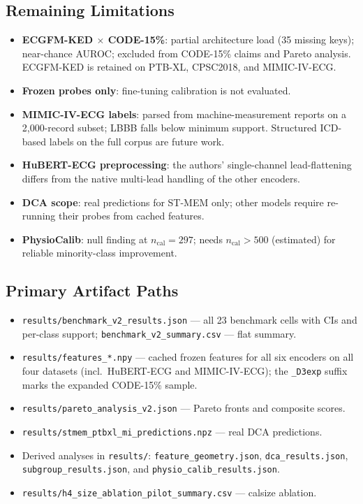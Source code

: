 \subsection{Remaining Limitations}

\begin{itemize}
  \item \textbf{ECGFM-KED $\times$ CODE-15\%}: partial architecture load (35 missing keys);
    near-chance AUROC; excluded from CODE-15\% claims and Pareto analysis. ECGFM-KED is
    retained on PTB-XL, CPSC2018, and MIMIC-IV-ECG.
  \item \textbf{Frozen probes only}: fine-tuning calibration is not evaluated.
  \item \textbf{MIMIC-IV-ECG labels}: parsed from machine-measurement reports on a
    2{,}000-record subset; LBBB falls below minimum support. Structured ICD-based labels on
    the full corpus are future work.
  \item \textbf{HuBERT-ECG preprocessing}: the authors' single-channel lead-flattening
    differs from the native multi-lead handling of the other encoders.
  \item \textbf{DCA scope}: real predictions for ST-MEM only; other models require re-running
    their probes from cached features.
  \item \textbf{PhysioCalib}: null finding at $n_\mathrm{cal}=297$; needs
    $n_\mathrm{cal}\!>\!500$ (estimated) for reliable minority-class improvement.
\end{itemize}

\subsection{Primary Artifact Paths}

\begin{itemize}
  \item \texttt{results/benchmark\_v2\_results.json} --- all 23 benchmark cells with CIs and
    per-class support; \texttt{benchmark\_v2\_summary.csv} --- flat summary.
  \item \texttt{results/features\_*.npy} --- cached frozen features for all six encoders on
    all four datasets (incl.\ HuBERT-ECG and MIMIC-IV-ECG); the \texttt{\_D3exp} suffix marks
    the expanded CODE-15\% sample.
  \item \texttt{results/pareto\_analysis\_v2.json} --- Pareto fronts and composite scores.
  \item \texttt{results/stmem\_ptbxl\_mi\_predictions.npz} --- real DCA predictions.
  \item Derived analyses in \texttt{results/}: \texttt{feature\_geometry.json},
    \texttt{dca\_results.json}, \texttt{subgroup\_results.json}, and
    \texttt{physio\_calib\_results.json}.
  \item \texttt{results/h4\_size\_ablation\_pilot\_summary.csv} --- calsize ablation.
\end{itemize}
